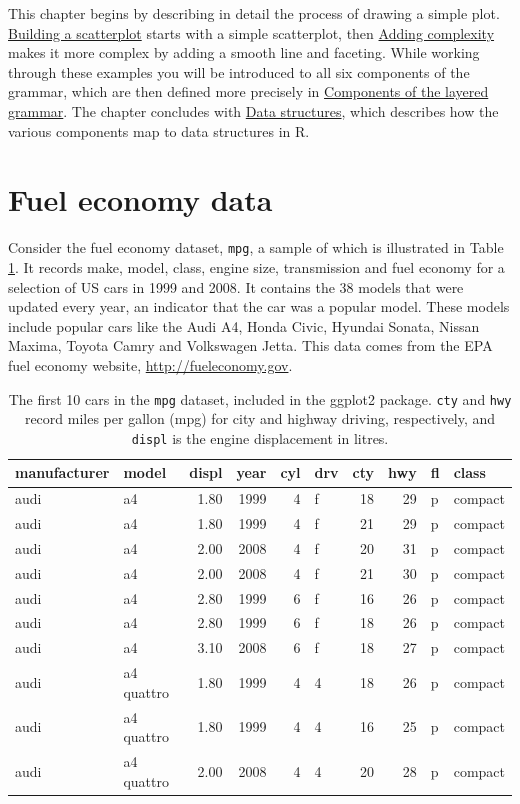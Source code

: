This chapter begins by describing in detail the process of drawing a
simple plot. \hyperref[sec:simple-plot]{Building a scatterplot} starts
with a simple scatterplot, then \hyperref[sec:complex-plot]{Adding
complexity} makes it more complex by adding a smooth line and faceting.
While working through these examples you will be introduced to all six
components of the grammar, which are then defined more precisely in
\hyperref[sec:components]{Components of the layered grammar}. The
chapter concludes with \hyperref[sec:data-structures]{Data structures},
which describes how the various components map to data structures in R.

\section{Fuel economy data}\label{sec:fuel-economy-data}

Consider the fuel economy dataset, \texttt{mpg}, a sample of which is
illustrated in Table \ref{tbl:mpg}. It records make, model, class,
engine size, transmission and fuel economy for a selection of US cars in
1999 and 2008. It contains the 38 models that were updated every year,
an indicator that the car was a popular model. These models include
popular cars like the Audi A4, Honda Civic, Hyundai Sonata, Nissan
Maxima, Toyota Camry and Volkswagen Jetta. This data comes from the EPA
fuel economy website, \url{http://fueleconomy.gov}.

\begin{table}[ht]
\centering
\begin{tabular}{llrrrlrrll}
  \hline
manufacturer & model & displ & year & cyl & drv & cty & hwy & fl & class \\ 
  \hline
audi & a4 & 1.80 & 1999 &   4 & f &  18 &  29 & p & compact \\ 
  audi & a4 & 1.80 & 1999 &   4 & f &  21 &  29 & p & compact \\ 
  audi & a4 & 2.00 & 2008 &   4 & f &  20 &  31 & p & compact \\ 
  audi & a4 & 2.00 & 2008 &   4 & f &  21 &  30 & p & compact \\ 
  audi & a4 & 2.80 & 1999 &   6 & f &  16 &  26 & p & compact \\ 
  audi & a4 & 2.80 & 1999 &   6 & f &  18 &  26 & p & compact \\ 
  audi & a4 & 3.10 & 2008 &   6 & f &  18 &  27 & p & compact \\ 
  audi & a4 quattro & 1.80 & 1999 &   4 & 4 &  18 &  26 & p & compact \\ 
  audi & a4 quattro & 1.80 & 1999 &   4 & 4 &  16 &  25 & p & compact \\ 
  audi & a4 quattro & 2.00 & 2008 &   4 & 4 &  20 &  28 & p & compact \\ 
   \hline
\end{tabular}
\caption{The first 10 cars in the \texttt{mpg} dataset, included in the ggplot2 package.  \texttt{cty} and \texttt{hwy} record miles per gallon (mpg) for city and highway driving, respectively, and \texttt{displ} is the engine displacement in litres.} 
\label{tbl:mpg}
\end{table}


